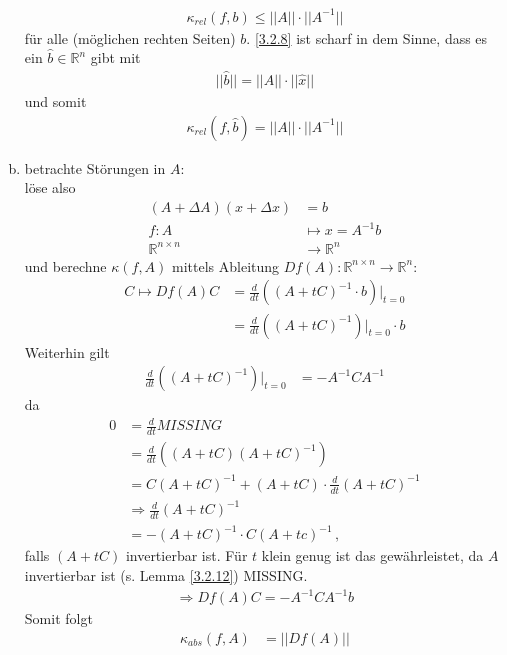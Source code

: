 \documentclass[ngerman,fontsize=11pt, paper=a4, parskip=false, titlepage=false, toc=bib]{scrbook}
\newcommand{\R}{\mathbb{R}}
\begin{document}
\begin{enumerate}[a)]
\begin{gather}
				\kappa_{rel}(f,b) \leq ||A|| \cdot ||A^{-1}|| \label{III.2.8}
			\end{gather}
			für alle (möglichen rechten Seiten) $b $.
			\ref{3.2.8} ist scharf in dem Sinne, dass es ein $\widehat{b}\in \R^n$ gibt 
			mit 
			\begin{gather*}
				||\widehat{b}|| = ||A||\cdot ||\widehat{x}||
			\end{gather*}
			und somit
			\begin{gather}
				\kappa_{rel}(f,\widehat{b}) = ||A||\cdot ||A^{-1}||
			\end{gather} %
	\item betrachte Störungen in $A$:\\
			löse also 
			\begin{align*}
				(A+\Delta A)(x+\Delta x) &= b \\
				f:A&\mapsto x= A^{-1}b \\
				\R^{n\times n}&\rightarrow \R^n
			\end{align*}
			und berechne $\kappa(f,A)$ mittels Ableitung $Df(A):\R^{n\times n} \rightarrow \R^n$:
			\begin{align*}
				C\mapsto Df(A) C&= \frac{d}{dt} \left((A+tC)^{-1} \cdot b\right) \Big\vert_{t=0} \\
										  & = \frac{d}{dt}\left((A+tC)^{-1}\right)\Big\vert_{t=0}\cdot b
			\end{align*}			
			Weiterhin gilt
			\begin{align*}
				\frac{d}{dt} \left((A+tC)^{-1}\right) \Big\vert_{t=0} &= -A^{-1}CA^{-1} \label{III.2.9}
			\end{align*}
			da
			\begin{align*}
				0&= \frac{d}{dt}MISSING \\
				  &= \frac{d}{dt}\left( (A+tC)(A+tC)^{-1}\right)\\
				  &= C(A+tC)^{-1} +(A+tC)\cdot \frac{d}{dt}(A+tC)^{-1} \\
				  &\Rightarrow \frac{d}{dt} (A+ tC)^{-1} \\
				  &= -(A+tC)^{-1} \cdot C(A+tc)^{-1} \, ,
			\end{align*}
			falls $(A+tC)$ invertierbar ist. Für $t$ klein genug ist das gewährleistet, da $A$ invertierbar ist (s. Lemma \ref{3.2.12}) MISSING.
			\begin{gather*}
				\Rightarrow Df(A) C = -A^{-1}CA^{-1}b
			\end{gather*}
			Somit folgt
			\begin{align*}
				\nonumber
				\kappa_{abs} (f,A) &= ||Df(A)|| \\ \nonumber

\end{align*}
\end{enumerate}
\end{document}
